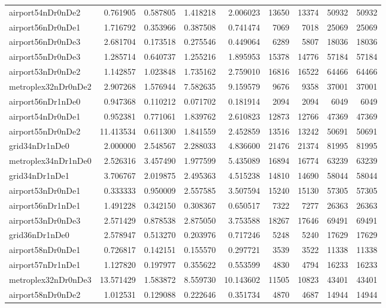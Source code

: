 \begin{longtable}{|l|r|r|r|r|r|r|r|r|}
airport54nDr0nDe2 & 0.761905 & 0.587805 & 1.418218 & 2.006023 & 13650 & 13374 & 50932 & 50932 \\
airport56nDr0nDe1 & 1.716792 & 0.353966 & 0.387508 & 0.741474 & 7069 & 7018 & 25069 & 25069 \\
airport56nDr0nDe3 & 2.681704 & 0.173518 & 0.275546 & 0.449064 & 6289 & 5807 & 18036 & 18036 \\
airport55nDr0nDe3 & 1.285714 & 0.640737 & 1.255216 & 1.895953 & 15378 & 14776 & 57184 & 57184 \\
airport53nDr0nDe2 & 1.142857 & 1.023848 & 1.735162 & 2.759010 & 16816 & 16522 & 64466 & 64466 \\
metroplex32nDr0nDe2 & 2.907268 & 1.576944 & 7.582635 & 9.159579 & 9676 & 9358 & 37001 & 37001 \\
airport56nDr1nDe0 & 0.947368 & 0.110212 & 0.071702 & 0.181914 & 2094 & 2094 & 6049 & 6049 \\
airport54nDr0nDe1 & 0.952381 & 0.771061 & 1.839762 & 2.610823 & 12873 & 12766 & 47369 & 47369 \\
airport55nDr0nDe2 & 11.413534 & 0.611300 & 1.841559 & 2.452859 & 13516 & 13242 & 50691 & 50691 \\
grid34nDr1nDe0 & 2.000000 & 2.548567 & 2.288033 & 4.836600 & 21476 & 21374 & 81995 & 81995 \\
metroplex34nDr1nDe0 & 2.526316 & 3.457490 & 1.977599 & 5.435089 & 16894 & 16774 & 63239 & 63239 \\
grid34nDr1nDe1 & 3.706767 & 2.019875 & 2.495363 & 4.515238 & 14810 & 14690 & 58044 & 58044 \\
airport53nDr0nDe1 & 0.333333 & 0.950009 & 2.557585 & 3.507594 & 15240 & 15130 & 57305 & 57305 \\
airport56nDr1nDe1 & 1.491228 & 0.342150 & 0.308367 & 0.650517 & 7322 & 7277 & 26363 & 26363 \\
airport53nDr0nDe3 & 2.571429 & 0.878538 & 2.875050 & 3.753588 & 18267 & 17646 & 69491 & 69491 \\
grid36nDr1nDe0 & 2.578947 & 0.513270 & 0.203976 & 0.717246 & 5248 & 5240 & 17629 & 17629 \\
airport58nDr0nDe1 & 0.726817 & 0.142151 & 0.155570 & 0.297721 & 3539 & 3522 & 11338 & 11338 \\
airport57nDr1nDe1 & 1.127820 & 0.197977 & 0.355622 & 0.553599 & 4830 & 4794 & 16233 & 16233 \\
metroplex32nDr0nDe3 & 13.571429 & 1.583872 & 8.559730 & 10.143602 & 11505 & 10823 & 43401 & 43401 \\
airport58nDr0nDe2 & 1.012531 & 0.129088 & 0.222646 & 0.351734 & 4870 & 4687 & 14944 & 14944 \\

\end{longtable}
